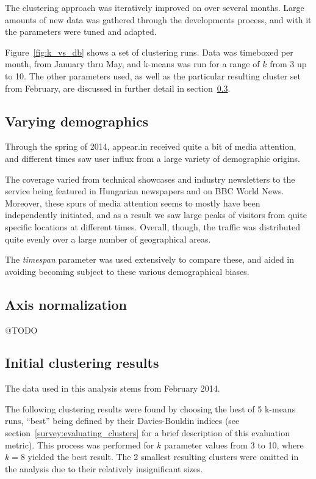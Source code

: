 The clustering approach was iteratively improved on over several months. Large amounts of new data was gathered through the developments process, and with it the parameters were tuned and adapted.

Figure~\ref{fig:k_vs_db} shows a set of clustering runs. Data was timeboxed per month, from January thru May, and k-means was run for a range of $k$ from 3 up to 10. The other parameters used, as well as the particular resulting cluster set from February, are discussed in further detail in section~\ref{eval:sec:clustering_results}.

\subsection{Varying demographics}
\label{eval:sub:varying_demographics}

Through the spring of 2014, appear.in received quite a bit of media attention, and different times saw user influx from a large variety of demographic origins.

The coverage varied from technical showcases and industry newsletters to the service being featured in Hungarian newspapers and on BBC World News. Moreover, these spurs of media attention seems to mostly have been independently initiated, and as a result we saw large peaks of visitors from quite specific locations at different times. Overall, though, the traffic was distributed quite evenly over a large number of geographical areas.

The \emph{timespan} parameter was used extensively to compare these, and aided in avoiding becoming subject to these various demographical biases.

\subsection{Axis normalization}
\label{eval:sub:axis_normalization}

@TODO

\subsection{Initial clustering results}
\label{eval:sec:clustering_results}

The data used in this analysis stems from February 2014.

The following clustering results were found by choosing the best of 5 k-means runs, ``best'' being defined by their Davies-Bouldin indices (see section~\ref{survey:evaluating_clusters} for a brief description of this evaluation metric). This process was performed for $k$ parameter values from 3 to 10, where $k = 8$ yielded the best result. The 2 smallest resulting clusters were omitted in the analysis due to their relatively insignificant sizes.

